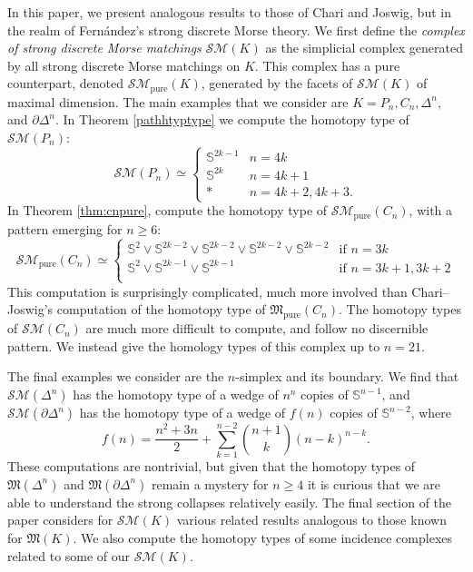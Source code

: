 \documentclass{amsart}
\theoremstyle{definition}
\newcommand{\zs}{{\mathbb S}}
\newcommand{\sm}{{\mathcal{SM}}}
\newcommand{\smpure}{{\mathcal{SM}}_{\textrm{pure}}}
\begin{document}
In this paper, we present analogous results to those of Chari and Joswig, but in the realm of Fern\'andez's strong discrete Morse theory. We first define the \textit{complex of strong discrete Morse matchings} $\sm(K)$ as the simplicial complex generated by all strong discrete Morse matchings on $K$. This complex has a pure counterpart, denoted $\smpure(K)$, generated by the facets of $\sm(K)$ of maximal dimension. The main examples that we consider are $K=P_n,C_n,\Delta^n,$ and $\partial\Delta^n$. In Theorem \ref{pathhtyptype} we compute the homotopy type of $\sm(P_n)$:
$$\sm(P_n) \simeq \begin{cases}
    \zs^{2k-1} & n=4k \\
    \zs^{2k} & n=4k+1 \\
    \ast & n=4k+2,4k+3.
\end{cases}$$
In Theorem \ref{thm:cnpure}, compute the homotopy type of $\smpure(C_n)$, with a pattern emerging for $n\geq6$:
\begin{equation*}
\smpure(C_n)\simeq
    \begin{cases}
        \mathbb{S}^{2}\vee\mathbb{S}^{2k-2}\vee\mathbb{S}^{2k-2}\vee\mathbb{S}^{2k-2}\vee\mathbb{S}^{2k-2} & \text{if } n=3k\\
        \mathbb{S}^{2}\vee\mathbb{S}^{2k-1}\vee\mathbb{S}^{2k-1} & \text{if } n=3k+1, 3k+2\\
    \end{cases}
\end{equation*}
This computation is surprisingly complicated, much more involved than Chari--Joswig's computation of the homotopy type of ${\mathfrak M}_\textrm{pure}(C_n)$. The homotopy types of $\sm(C_n)$ are much more difficult to compute, and follow no discernible pattern. We instead give the homology types of this complex up to $n=21$.

The final examples we consider are the $n$-simplex and its boundary. We find that $\sm(\Delta^n)$ has the homotopy type of a wedge of $n^n$ copies of $\zs^{n-1}$, and $\sm(\partial\Delta^n)$ has the homotopy type of a wedge of $f(n)$ copies of $\zs^{n-2}$, where
\begin{equation*}
    f(n) = \frac{n^2 + 3n}{2} + \sum_{k=1}^{n-2} \binom{n+1}{k}(n-k)^{n-k}.
\end{equation*}
These computations are nontrivial, but given that the homotopy types of ${\mathfrak M}(\Delta^n)$ and ${\mathfrak M}(\partial\Delta^n)$ remain a mystery for $n\ge 4$ it is curious that we are able to understand the strong collapses relatively easily.
The final section of the paper considers for $\sm(K)$ various related results analogous to those known for ${\mathfrak M}(K)$. We also compute the homotopy types of some incidence complexes related to some of our $\sm(K)$.
\end{document}
